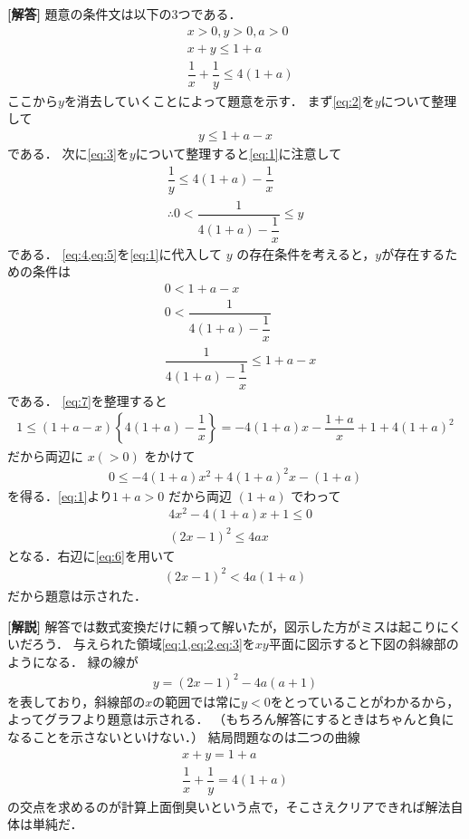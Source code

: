 \documentclass[../../main.tex]{subfiles}
\begin{document}
\begin{oframed}
  
\end{oframed}

{\bf [解答]}
題意の条件文は以下の3つである．
\begin{align}
  & x > 0, y > 0, a > 0 \label{eq:1} \\
  & x + y \le 1 + a \label{eq:2} \\
  & \dfrac{1}{x} + \dfrac{1}{y} \le 4(1+a) \label{eq:3}
\end{align}
ここから$y$を消去していくことによって題意を示す．
まず\cref{eq:2}を$y$について整理して
\begin{align}
  y \le 1 + a - x \label{eq:4}
\end{align}
である．
次に\cref{eq:3}を$y$について整理すると\cref{eq:1}に注意して
\begin{align}
  \dfrac{1}{y} \le 4(1+a) - \dfrac{1}{x} \\
  \therefore
  0 < \dfrac{1}{4(1+a) - \dfrac{1}{x}} \le y  \label{eq:5}
\end{align}
である．
\cref{eq:4,eq:5}を\cref{eq:1}に代入して $y$ の存在条件を考えると，$y$が存在するための条件は
\begin{align}
  & 0 < 1 + a - x \label{eq:6} \\
  & 0 < \dfrac{1}{4(1+a) - \dfrac{1}{x}} \\
  & \dfrac{1}{4(1+a) - \dfrac{1}{x}} \le 1 + a - x \label{eq:7}
\end{align}
である．
\cref{eq:7}を整理すると
\begin{align}
  1 \le (1+a-x) \left\{ 4(1+a) - \dfrac{1}{x} \right\} = -4(1+a)x - \dfrac{1+a}{x} + 1 + 4(1+a)^2
\end{align}
だから両辺に $x (>0)$ をかけて
\begin{align}
  0 \le -4(1+a)x^2 + 4(1+a)^2 x - (1+a)
\end{align}
を得る．\cref{eq:1}より$1+a > 0$ だから両辺 $(1+a)$ でわって
\begin{align}
  &4x^2 - 4(1+a)x + 1 \le 0 \\
  &(2x - 1)^2 \le 4ax
\end{align}
となる．右辺に\cref{eq:6}を用いて
\begin{align}
  (2x - 1)^2 < 4a(1+a)
\end{align}
だから題意は示された．

{\bf [解説]}
解答では数式変換だけに頼って解いたが，図示した方がミスは起こりにくいだろう．
与えられた領域\cref{eq:1,eq:2,eq:3}を$xy$平面に図示すると下図の斜線部のようになる．
緑の線が
\begin{align}
  y = (2x-1)^2 -4a(a+1)
\end{align}
を表しており，斜線部の$x$の範囲では常に$y<0$をとっていることがわかるから，よってグラフより題意は示される．
（もちろん解答にするときはちゃんと負になることを示さないといけない．）
結局問題なのは二つの曲線
\begin{align}
  x+y = 1+a \\
  \dfrac{1}{x} + \dfrac{1}{y} = 4(1+a)
\end{align}
の交点を求めるのが計算上面倒臭いという点で，そこさえクリアできれば解法自体は単純だ．
\end{document}
